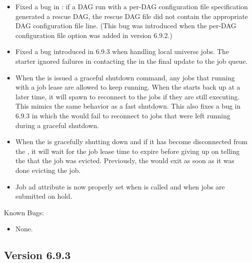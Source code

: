 \begin{itemize}

\item Fixed a bug in : if a DAG run with a per-DAG
configuration file specification generated a rescue DAG, the rescue
DAG file did not contain the appropriate DAG configuration file line.
(This bug was introduced when the per-DAG configuration file option
was added in version 6.9.2.)

\item Fixed a bug introduced in 6.9.3 when handling local universe jobs.
The starter ignored failures in contacting the  in the
final update to the job queue.

\item When the  is issued a graceful shutdown command, any jobs
that running with a job lease are allowed to keep running. When the 
starts back up at a later time, it will spawn  to reconnect
to the jobs if they are still executing. This mimics the same behavior as
a fast shutdown.  This also fixes a bug in 6.9.3 in which the 
would fail to reconnect to jobs that were left running during a graceful
shutdown.

\item When the  is gracefully shutting down and if it
has become disconnected from the , it will wait for the
job lease time to expire before giving up on telling the 
that the job was evicted.  Previously, the  would exit
as soon as it was done evicting the job.

\item Job ad attribute  is now properly set when
 is called and when jobs are submitted on hold.

\end{itemize}

\noindent Known Bugs:

\begin{itemize}

\item None.

\end{itemize}


\subsection*{\label{sec:New-6-9-3}Version 6.9.3}

